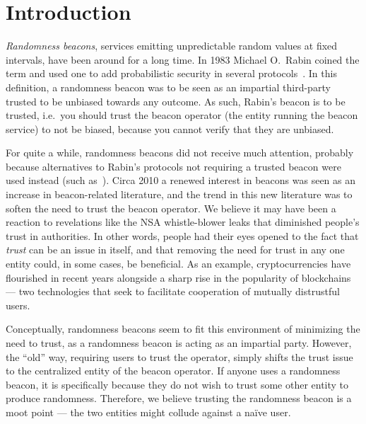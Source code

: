 \section{Introduction}
\emph{Randomness beacons}, services emitting unpredictable random values at fixed intervals, have been around for a long time.
In 1983 Michael O.\ Rabin coined the term and used one to add probabilistic security in several protocols~\cite{rabin1983transaction}.
In this definition, a randomness beacon was to be seen as an impartial third-party trusted to be unbiased towards any outcome.
As such, Rabin's beacon is to be trusted, i.e.\ you should trust the beacon operator (the entity running the beacon service) to not be biased, because you cannot verify that they are unbiased.

For quite a while, randomness beacons did not receive much attention, probably because alternatives to Rabin's protocols not requiring a trusted beacon were used instead (such as~\cite{BGMR}).
Circa 2010 a renewed interest in beacons was seen as an increase in beacon-related literature, and the trend in this new literature was to soften the need to trust the beacon operator.
We believe it may have been a reaction to revelations like the NSA whistle-blower leaks that diminished people's trust in authorities.
In other words, people had their eyes opened to the fact that \emph{trust} can be an issue in itself, and that removing the need for trust in any one entity could, in some cases, be beneficial.
As an example, cryptocurrencies have flourished in recent years alongside a sharp rise in the popularity of blockchains --- two technologies that seek to facilitate cooperation of mutually distrustful users.

Conceptually, randomness beacons seem to fit this environment of minimizing the need to trust, as a randomness beacon is acting as an impartial party.
However, the \enquote{old} way, requiring users to trust the operator, simply shifts the trust issue to the centralized entity of the beacon operator.
If anyone uses a randomness beacon, it is specifically because they do not wish to trust some other entity to produce randomness.
Therefore, we believe trusting the randomness beacon is a moot point --- the two entities might collude against a naïve user.



